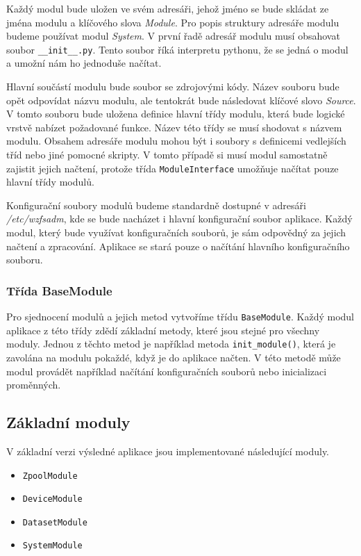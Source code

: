     Každý modul bude uložen ve svém adresáři, jehož jméno se bude skládat ze jména modulu a klíčového slova \emph{Module}. Pro popis struktury adresáře modulu budeme používat modul \emph{System}. V první řadě adresář modulu musí obsahovat soubor \verb|__init__.py|. Tento soubor říká interpretu pythonu, že se jedná o modul a umožní nám ho jednoduše načítat.

    Hlavní součástí modulu bude soubor se zdrojovými kódy. Název souboru bude opět odpovídat názvu modulu, ale tentokrát bude následovat klíčové slovo \emph{Source}.
    V tomto souboru bude uložena definice hlavní třídy modulu, která bude logické vrstvě nabízet požadované funkce. Název této třídy se musí shodovat s názvem modulu. Obsahem adresáře modulu mohou být i soubory s definicemi vedlejších tříd nebo jiné pomocné skripty. V tomto případě si musí modul samostatně zajistit jejich načtení, protože třída \verb|ModuleInterface| umožňuje načítat pouze hlavní třídy modulů.

    Konfigurační soubory modulů budeme standardně dostupné v adresáři \emph{/etc/wzfsadm}, kde se bude nacházet i hlavní konfigurační soubor aplikace. Každý modul, který bude využívat konfiguračních souborů, je sám odpovědný za jejich načtení a zpracování. Aplikace se stará pouze o načítání hlavního konfiguračního souboru.

    \subsubsection{Třída BaseModule}
    Pro sjednocení modulů a jejich metod vytvoříme třídu \verb|BaseModule|. Každý modul aplikace z této třídy zdědí základní metody, které jsou stejné pro všechny moduly.
    Jednou z těchto metod je například metoda \verb|init_module()|, která je zavolána na modulu pokaždé, když je do aplikace načten. V této metodě může modul provádět například načítání konfiguračních souborů nebo inicializaci proměnných.

    \subsection{Základní moduly}
    V základní verzi výsledné aplikace jsou implementované následující moduly.
    \begin{itemize}
      \item \verb|ZpoolModule|
      \item \verb|DeviceModule|
      \item \verb|DatasetModule|
      \item \verb|SystemModule|
    \end{itemize}

